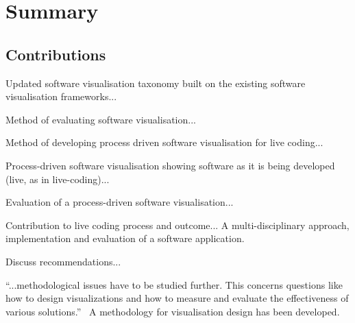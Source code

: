 
\chapter{Summary}
\label{chap:summary}


\section{Contributions}

Updated software visualisation taxonomy built on the existing software visualisation frameworks...

Method of evaluating software visualisation...

Method of developing process driven software visualisation for live coding...

Process-driven software visualisation showing software as it is being developed (live, as in live-coding)...

Evaluation of a process-driven software visualisation...

Contribution to live coding process and outcome... A multi-disciplinary approach, implementation and evaluation of a software application.

Discuss recommendations...

``...methodological issues have to be studied further. This concerns questions like how to design visualizations and how to measure and evaluate the effectiveness of various solutions.''~\cite{VanWijk2005} A methodology for visualisation design has been developed.

